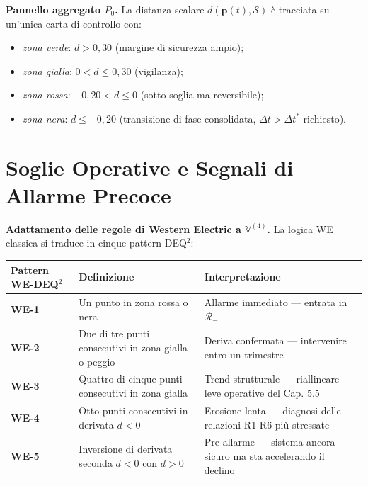 \Hypoth{} \textbf{Pannello aggregato \(P_0\).} La distanza scalare
\(d(\boldsymbol{p}(t), \mathcal{S})\) è tracciata su un'unica carta di
controllo con:

\begin{itemize}
\tightlist
\item
  \emph{zona verde}: \(d > 0{,}30\) (margine di sicurezza ampio);
\item
  \emph{zona gialla}: \(0 < d \leq 0{,}30\) (vigilanza);
\item
  \emph{zona rossa}: \(-0{,}20 < d \leq 0\) (sotto soglia ma
  reversibile);
\item
  \emph{zona nera}: \(d \leq -0{,}20\) (transizione di fase consolidata,
  \(\Delta t > \Delta t^*\) richiesto).
\end{itemize}



\section{Soglie Operative e Segnali di Allarme
Precoce}\label{soglie-operative-e-segnali-di-allarme-precoce}

\Hypoth{} \textbf{Adattamento delle regole di Western Electric a
\(\mathbb{V}^{(4)}\).} La logica WE classica si traduce in cinque
pattern DEQ$^2$:

{\def\LTcaptype{none} %
{\small\begin{longtable}[]{@{}
  >{\raggedright\arraybackslash}p{}
  >{\raggedright\arraybackslash}p{}
  >{\raggedright\arraybackslash}p{}@{}}
\toprule\noalign{}
\begin{minipage}[b]{\linewidth}\raggedright
Pattern WE-DEQ$^2$
\end{minipage} & \begin{minipage}[b]{\linewidth}\raggedright
Definizione
\end{minipage} & \begin{minipage}[b]{\linewidth}\raggedright
Interpretazione
\end{minipage} \\
\midrule\noalign{}
\endhead
\bottomrule\noalign{}
\endlastfoot
\textbf{WE-1} & Un punto in zona rossa o nera & Allarme immediato ---
entrata in \(\mathcal{R}_-\) \\
\textbf{WE-2} & Due di tre punti consecutivi in zona gialla o peggio &
Deriva confermata --- intervenire entro un trimestre \\
\textbf{WE-3} & Quattro di cinque punti consecutivi in zona gialla &
Trend strutturale --- riallineare leve operative del Cap. 5.5 \\
\textbf{WE-4} & Otto punti consecutivi in derivata \(\dot d < 0\) &
Erosione lenta --- diagnosi delle relazioni R1-R6 più stressate \\
\textbf{WE-5} & Inversione di derivata seconda \(\ddot d < 0\) con
\(d > 0\) & Pre-allarme --- sistema ancora sicuro ma sta accelerando il
declino \\
\end{longtable}}
}

